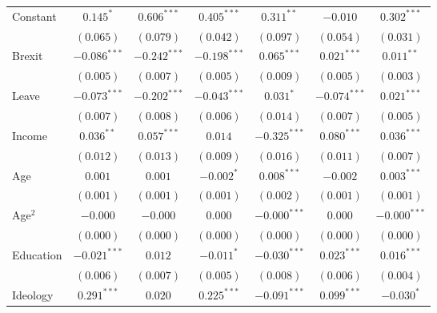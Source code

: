 \documentclass[12pt, letter]{article}
\begin{document}
\begin{table}[H]
\begin{center}
{\begin{tabular}{l c c c c c c}
Constant                         & $0.145^{*}$    & $0.606^{***}$  & $0.405^{***}$  & $0.311^{**}$   & $-0.010$       & $0.302^{***}$  \\
                                 & $(0.065)$      & $(0.079)$      & $(0.042)$      & $(0.097)$      & $(0.054)$      & $(0.031)$      \\
Brexit                           & $-0.086^{***}$ & $-0.242^{***}$ & $-0.198^{***}$ & $0.065^{***}$  & $0.021^{***}$  & $0.011^{**}$   \\
                                 & $(0.005)$      & $(0.007)$      & $(0.005)$      & $(0.009)$      & $(0.005)$      & $(0.003)$      \\
Leave                            & $-0.073^{***}$ & $-0.202^{***}$ & $-0.043^{***}$ & $0.031^{*}$    & $-0.074^{***}$ & $0.021^{***}$  \\
                                 & $(0.007)$      & $(0.008)$      & $(0.006)$      & $(0.014)$      & $(0.007)$      & $(0.005)$      \\
Income                           & $0.036^{**}$   & $0.057^{***}$  & $0.014$        & $-0.325^{***}$ & $0.080^{***}$  & $0.036^{***}$  \\
                                 & $(0.012)$      & $(0.013)$      & $(0.009)$      & $(0.016)$      & $(0.011)$      & $(0.007)$      \\
Age                              & $0.001$        & $0.001$        & $-0.002^{*}$   & $0.008^{***}$  & $-0.002$       & $0.003^{***}$  \\
                                 & $(0.001)$      & $(0.001)$      & $(0.001)$      & $(0.002)$      & $(0.001)$      & $(0.001)$      \\
Age$^2$                            & $-0.000$       & $-0.000$       & $0.000$        & $-0.000^{***}$ & $0.000$        & $-0.000^{***}$ \\
                                 & $(0.000)$      & $(0.000)$      & $(0.000)$      & $(0.000)$      & $(0.000)$      & $(0.000)$      \\
Education                        & $-0.021^{***}$ & $0.012$        & $-0.011^{*}$   & $-0.030^{***}$ & $0.023^{***}$  & $0.016^{***}$  \\
                                 & $(0.006)$      & $(0.007)$      & $(0.005)$      & $(0.008)$      & $(0.006)$      & $(0.004)$      \\
Ideology                         & $0.291^{***}$  & $0.020$        & $0.225^{***}$  & $-0.091^{***}$ & $0.099^{***}$  & $-0.030^{*}$   \\

\end{tabular}}
\end{center}
\end{table}
\end{document}
